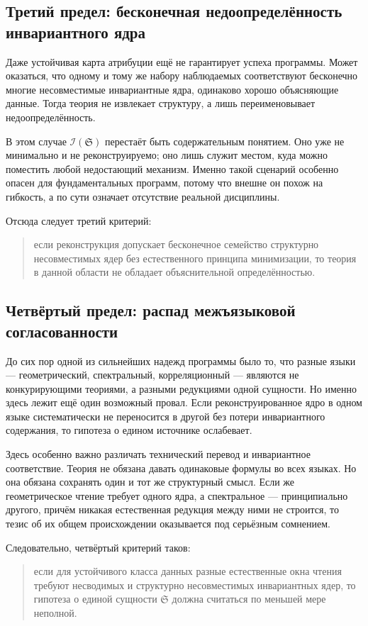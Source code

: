 \documentclass[12pt,a4paper]{article}
\begin{document}
\subsection{Третий предел: бесконечная недоопределённость инвариантного ядра}

Даже устойчивая карта атрибуции ещё не гарантирует успеха программы. Может оказаться, что одному и тому же набору наблюдаемых соответствуют бесконечно многие несовместимые инвариантные ядра, одинаково хорошо объясняющие данные. Тогда теория не извлекает структуру, а лишь переименовывает недоопределённость.

В этом случае \(\mathcal{I}(\mathfrak{S})\) перестаёт быть содержательным понятием. Оно уже не минимально и не реконструируемо; оно лишь служит местом, куда можно поместить любой недостающий механизм. Именно такой сценарий особенно опасен для фундаментальных программ, потому что внешне он похож на гибкость, а по сути означает отсутствие реальной дисциплины.

Отсюда следует третий критерий:
\begin{quote}
если реконструкция допускает бесконечное семейство структурно несовместимых ядер без естественного принципа минимизации, то теория в данной области не обладает объяснительной определённостью.
\end{quote}

\subsection{Четвёртый предел: распад межъязыковой согласованности}

До сих пор одной из сильнейших надежд программы было то, что разные языки --- геометрический, спектральный, корреляционный --- являются не конкурирующими теориями, а разными редукциями одной сущности. Но именно здесь лежит ещё один возможный провал. Если реконструированное ядро в одном языке систематически не переносится в другой без потери инвариантного содержания, то гипотеза о едином источнике ослабевает.

Здесь особенно важно различать технический перевод и инвариантное соответствие. Теория не обязана давать одинаковые формулы во всех языках. Но она обязана сохранять один и тот же структурный смысл. Если же геометрическое чтение требует одного ядра, а спектральное --- принципиально другого, причём никакая естественная редукция между ними не строится, то тезис об их общем происхождении оказывается под серьёзным сомнением.

Следовательно, четвёртый критерий таков:
\begin{quote}
если для устойчивого класса данных разные естественные окна чтения требуют несводимых и структурно несовместимых инвариантных ядер, то гипотеза о единой сущности \(\mathfrak{S}\) должна считаться по меньшей мере неполной.
\end{quote}
\end{document}
